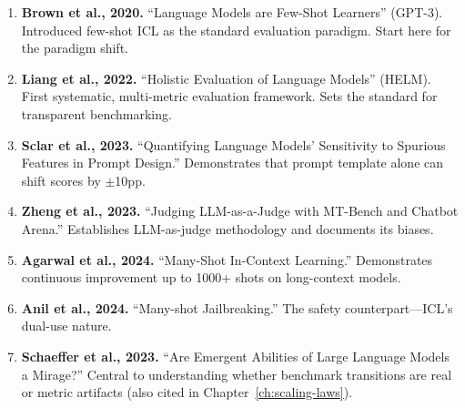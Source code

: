 \begin{enumerate}[nosep]
  \item \textbf{Brown et al., 2020.} ``Language Models are Few-Shot Learners'' (GPT-3). Introduced few-shot ICL as the standard evaluation paradigm. Start here for the paradigm shift.
  \item \textbf{Liang et al., 2022.} ``Holistic Evaluation of Language Models'' (HELM). First systematic, multi-metric evaluation framework. Sets the standard for transparent benchmarking.
  \item \textbf{Sclar et al., 2023.} ``Quantifying Language Models' Sensitivity to Spurious Features in Prompt Design.'' Demonstrates that prompt template alone can shift scores by $\pm$10pp.
  \item \textbf{Zheng et al., 2023.} ``Judging LLM-as-a-Judge with MT-Bench and Chatbot Arena.'' Establishes LLM-as-judge methodology and documents its biases.
  \item \textbf{Agarwal et al., 2024.} ``Many-Shot In-Context Learning.'' Demonstrates continuous improvement up to 1000+ shots on long-context models.
  \item \textbf{Anil et al., 2024.} ``Many-shot Jailbreaking.'' The safety counterpart---ICL's dual-use nature.
  \item \textbf{Schaeffer et al., 2023.} ``Are Emergent Abilities of Large Language Models a Mirage?'' Central to understanding whether benchmark transitions are real or metric artifacts (also cited in Chapter~\ref{ch:scaling-laws}).
\end{enumerate}

\flushbottom
